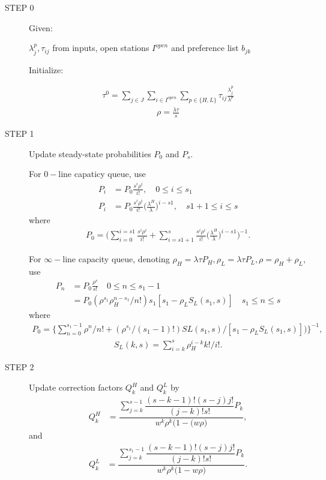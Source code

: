 \documentclass{article}
\begin{document}
\begin{description}
\item[STEP 0]
Given:

$\lambda_j^p, \tau_{ij}$ from inputs, open stations $I^{open}$ and preference list $b_{jk}$

Initialize:

\begin{align}
\tau^0=\sum_{j\in J} \sum_{i \in I^{open}} \sum_{p\in \{H,L\}} \tau_{ij} \frac{\lambda^p_j}{\lambda^p}
\end{align}
\begin{align}
\rho=\frac{\lambda \tau}{s}
\end{align}

\item[STEP 1] Update steady-state probabilities $P_0$ and $P_s$.

For $0-$line capaticy queue, use
\begin{align}
P_i &= P_0 \frac{s^i\rho^i}{i!}, \quad 0 \leq i \leq s_1\\ \nonumber
P_i &= P_0 \frac{s^i\rho^i}{i!} \big(\frac{\lambda^H}{\lambda}\big)^{i-s1}, \quad s1+1 \leq i \leq s
\end{align}
where
\begin{align}
P_0 = \big( \sum_{i=0}^{i=s1} \frac{s^i\rho^i}{i!} + \sum_{i=s1+1}^s  \frac{s^i\rho^i}{i!} \big(\frac{\lambda^H}{\lambda}\big)^{i-s1} \big)^{-1}.
\end{align}

For $\infty-$line capacity queue, denoting $\rho_H=\lambda \tau P_H, \rho_L = \lambda \tau P_L, \rho = \rho_H+\rho_L$, use
\begin{align}
P_n & = P_0 \frac{\rho^s}{s!} \quad 0 \leq n \leq s_1-1\\
      & = P_0(\rho^{s_1} \rho_H^{n-s_1}/n!)s_1[s_1-\rho_L S_L(s_1,s)]  \quad s_1 \leq n \leq s
\end{align}
where
\begin{align}
P_0 = \{\sum_{n=0}^{s_1-1} \rho^n / n! + (\rho^{s_1}/(s_1-1)!)SL(s_1,s)/[s_1-\rho_L S_L(s_1,s)])   \}^{-1},
\end{align}
\begin{align}
S_L(k,s) = \sum_{i=k}^s \rho_H^{i-k} k!/i!.
\end{align}

\item[STEP 2] Update correction factors $Q_k^H$ and $Q_k^L$ by
\begin{align}
 Q_k^H  & = \dfrac{ \sum_{j=k}^{s-1} \dfrac{ (s-k-1)! (s-j) j!}{(j-k)!s!} P_k }
      { w^k \rho^k  \big( 1-(w\rho \big) },
\end{align}
and
\begin{align}
 Q_k^L  & = \dfrac{ \sum_{j=k}^{s_1-1} \dfrac{ (s-k-1)! (s-j) j!}{(j-k)!s!} P_k }
      { w^k \rho^k  \big( 1-w\rho \big) }.
\end{align}


\end{description}
\end{document}
